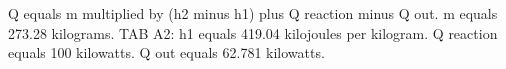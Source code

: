 Q equals m multiplied by (h2 minus h1) plus Q reaction minus Q out.  
m equals 273.28 kilograms.  
TAB A2:  
h1 equals 419.04 kilojoules per kilogram.  
Q reaction equals 100 kilowatts.  
Q out equals 62.781 kilowatts.